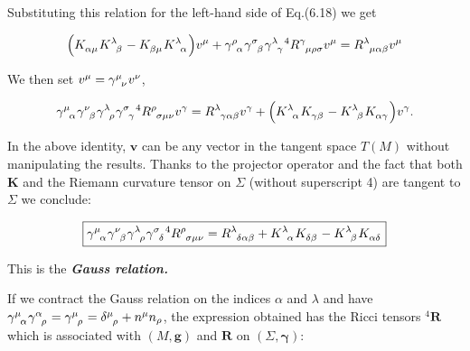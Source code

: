 \documentclass[12pt]{article}
\renewcommand{\vec}[1]{\bm{#1}}
\numberwithin{equation}{section}
\numberwithin{theorem}{subsection}
\begin{document}
Substituting this relation for the left-hand side of Eq.(6.18) we get

\begin{equation*}

  \Big(\tensor{K}{_\alpha_\mu}\tensor{K}{^\lambda_\beta} - \tensor{K}{_\beta_\mu}\tensor{K}{^\lambda_\alpha} \Big)v^{\mu} + \tensor{\gamma}{^\rho_\alpha}\tensor{\gamma}{^\sigma_\beta}\tensor{\gamma}{^\lambda_\gamma}^{4}\tensor{R}{^\gamma_\mu_\rho_\sigma}v^{\mu} = \tensor{R}{^\lambda_\mu_\alpha_\beta}v^{\mu} 

\end{equation*}

We then set $v^{\mu}=\tensor{\gamma}{^\mu_\nu}v^{\nu}$,

\begin{equation*}

  \tensor{\gamma}{^\mu_\alpha}\tensor{\gamma}{^\nu_\beta}\tensor{\gamma}{^\lambda_\rho}\tensor{\gamma}{^\sigma_\gamma} ^{4}\tensor{R}{^\rho_\sigma_\mu_\nu}v^{\gamma} = \tensor{R}{^\lambda_\gamma_\alpha_\beta}v^{\gamma} + \Big( \tensor{K}{^\lambda_\alpha}\tensor{K}{_\gamma_\beta} - \tensor{K}{^\lambda_\beta}\tensor{K}{_\alpha_\gamma} \Big)v^{\gamma}.  

\end{equation*}

In the above identity, $\vec{v}$ can be any vector in the tangent space $T(M)$ without manipulating the results. Thanks to the  projector operator and the fact that both $\vec{K}$ and the Riemann curvature tensor on $\Sigma$ (without superscript 4) are tangent to $\Sigma$ we conclude:

\begin{equation}

    \boxed{\tensor{\gamma}{^\mu_\alpha}\tensor{\gamma}{^\nu_\beta}\tensor{\gamma}{^\lambda_\rho}\tensor{\gamma}{^\sigma_\delta} ^{4}\tensor{R}{^\rho_\sigma_\mu_\nu} = \tensor{R}{^\lambda_\delta_\alpha_\beta}+\tensor{K}{^\lambda_\alpha}\tensor{K}{_\delta_\beta}-\tensor{K}{^\lambda_\beta}\tensor{K}{_\alpha_\delta}}

\end{equation}

This is the \textbf{\textit{Gauss relation.}}

\newline

If we contract the Gauss relation on the indices $\alpha$ and $\lambda$ and have $\tensor{\gamma}{^\mu_\alpha}\tensor{\gamma}{^\alpha_\rho}=\tensor{\gamma}{^\mu_\rho}=\tensor{\delta}{^\mu_\rho}+n^{\mu}n_{\rho}$, the expression obtained has the Ricci tensors $^{4}\vec{R}$ which is associated with $(M,\vec{g})$ and $\vec{R}$ on $(\Sigma,\vec{\gamma})$:
\end{document}

